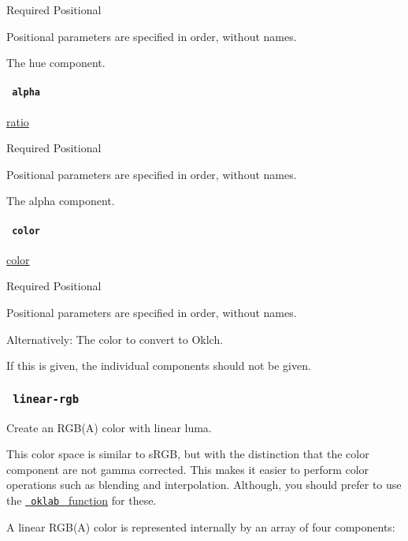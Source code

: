 {Required} {{ Positional }}

\label{definitions-oklch-hue-positional-tooltip}
Positional parameters are specified in order, without names.

The hue component.

\paragraph{\texorpdfstring{\texttt{\ alpha\ }}{ alpha }}\label{definitions-oklch-alpha}

\href{/docs/reference/layout/ratio/}{ratio}

{Required} {{ Positional }}

\label{definitions-oklch-alpha-positional-tooltip}
Positional parameters are specified in order, without names.

The alpha component.

\paragraph{\texorpdfstring{\texttt{\ color\ }}{ color }}\label{definitions-oklch-color}

\href{/docs/reference/visualize/color/}{color}

{Required} {{ Positional }}

\label{definitions-oklch-color-positional-tooltip}
Positional parameters are specified in order, without names.

Alternatively: The color to convert to Oklch.

If this is given, the individual components should not be given.

\subsubsection{\texorpdfstring{\texttt{\ linear-rgb\ }}{ linear-rgb }}\label{definitions-linear-rgb}

Create an RGB(A) color with linear luma.

This color space is similar to sRGB, but with the distinction that the
color component are not gamma corrected. This makes it easier to perform
color operations such as blending and interpolation. Although, you
should prefer to use the
\href{/docs/reference/visualize/color/\#definitions-oklab}{\texttt{\ oklab\ }
function} for these.

A linear RGB(A) color is represented internally by an array of four
components:

